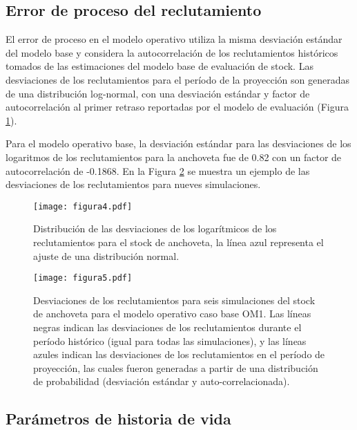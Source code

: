 
\subsection{Error de proceso del reclutamiento}

El error de proceso en el modelo operativo utiliza la misma desviación estándar del modelo base y considera la autocorrelación de los reclutamientos históricos tomados de las estimaciones del modelo base de evaluación de stock. Las desviaciones de los reclutamientos para el período de la proyección son generadas de una distribución log-normal, con una desviación estándar y factor de autocorrelación al primer retraso reportadas por el modelo de evaluación (Figura \ref{fig:figura4}). 
\newline

Para el modelo operativo base, la desviación estándar para las desviaciones de los logaritmos de los reclutamientos para la anchoveta fue de 0.82 con un factor de autocorrelación de -0.1868. En la Figura \ref{fig:figura5} se muestra un ejemplo de las desviaciones de los reclutamientos para nueves simulaciones.

\begin{figure}[H]
    \centering
    \texttt{[image: figura4.pdf]}
    \caption{Distribución de las desviaciones de los logarítmicos de los reclutamientos para el stock de anchoveta, la línea azul representa el ajuste de una distribución normal.}
    \label{fig:figura4}
\end{figure}

\begin{figure}[H]
    \centering
    \texttt{[image: figura5.pdf]}
    \caption{Desviaciones de los reclutamientos para seis simulaciones del stock de anchoveta para el modelo operativo caso base OM1. Las líneas negras indican las desviaciones de los reclutamientos durante el período histórico (igual para todas las simulaciones), y las líneas azules indican las desviaciones de los reclutamientos en el período de proyección, las cuales fueron generadas a partir de una distribución de probabilidad (desviación estándar y auto-correlacionada).}
    \label{fig:figura5}
\end{figure}

\subsection{Parámetros de historia de vida}

